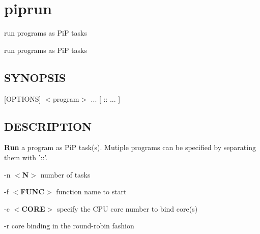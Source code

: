 \hypertarget{group__piprun}{\section{piprun}
\label{group__piprun}
}


run programs as Pi\-P tasks  


run programs as Pi\-P tasks \hypertarget{group__piplnlibs_synopsis}{}\subsection{S\-Y\-N\-O\-P\-S\-I\-S}\label{group__piplnlibs_synopsis}
{ }\mbox{[}O\-P\-T\-I\-O\-N\-S\mbox{]} $<$program$>$ ... \mbox{[} \-:\-: ... \mbox{]}\hypertarget{group__piplnlibs_description}{}\subsection{D\-E\-S\-C\-R\-I\-P\-T\-I\-O\-N}\label{group__piplnlibs_description}
{\bfseries Run} a program as Pi\-P task(s). Mutiple programs can be specified by separating them with '\-:\-:'.

-\/n {\bfseries $<$N$>$} number of tasks\par
-\/f {\bfseries $<$F\-U\-N\-C$>$} function name to start\par
-\/c {\bfseries $<$C\-O\-R\-E$>$} specify the C\-P\-U core number to bind core(s)\par
-\/r core binding in the round-\/robin fashion\par
